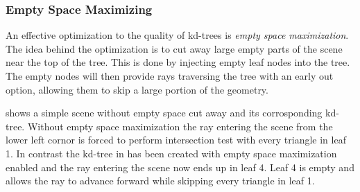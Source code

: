 \subsubsection{Empty Space Maximizing}\label{sec:emptySpace}

An effective optimization to the quality of kd-trees is \textit{empty
  space maximization}. The idea behind the optimization is to cut away
large empty parts of the scene near the top of the tree. This is done
by injecting empty leaf nodes into the tree. The empty nodes will then
provide rays traversing the tree with an early out option, allowing
them to skip a large portion of the geometry.

 shows a simple scene without empty
space cut away and its corrosponding kd-tree. Without empty space
maximization the ray entering the scene from the lower left cornor is
forced to perform intersection test with every triangle in leaf 1. In
contrast the kd-tree in  has been
created with empty space maximization enabled and the ray entering the
scene now ends up in leaf 4. Leaf 4 is empty and allows the ray to
advance forward while skipping every triangle in leaf 1.


